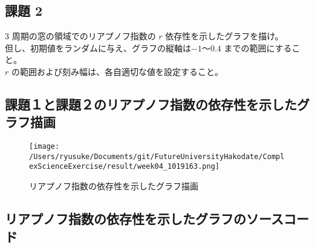 \documentclass[dvipdfmx,uplatex]{jsarticle}
\begin{document}
\subsection{課題 2}
  3 周期の窓の領域でのリアプノフ指数の $r$ 依存性を示したグラフを描け。\\
但し、初期値をランダムに与え、グラフの縦軸は$-1$～$0.4$ までの範囲にすること。\\
$r$ の範囲および刻み幅は、各自適切な値を設定すること。\\

\subsection{課題１と課題２のリアプノフ指数の依存性を示したグラフ描画}

\begin{figure}[htbp]
\begin{center}
\texttt{[image: /Users/ryusuke/Documents/git/FutureUniversityHakodate/ComplexScienceExercise/result/week04\_1019163.png]}
\caption{リアプノフ指数の依存性を示したグラフ描画}
\end{center}
\end{figure}

\newpage

\subsection{リアプノフ指数の依存性を示したグラフのソースコード}
\end{document}
